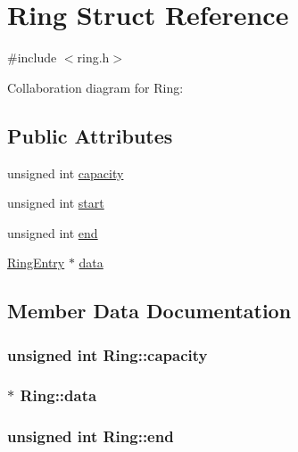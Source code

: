 \hypertarget{structRing}{}\section{Ring Struct Reference}
\label{structRing}


{\ttfamily \#include $<$ring.\+h$>$}



Collaboration diagram for Ring\+:
\subsection*{Public Attributes}
\begin{DoxyCompactItemize}
\item 
unsigned int \hyperlink{structRing_a49514c27dd8d8c6f850ac6cf86c3f8fc}{capacity}
\item 
unsigned int \hyperlink{structRing_a05ded3e84726b36d0b2266e733ddc61e}{start}
\item 
unsigned int \hyperlink{structRing_a704c118e618f3fac90554954b90ff363}{end}
\item 
\hyperlink{structRingEntry}{Ring\+Entry} $\ast$ \hyperlink{structRing_a610017b8cf1bff81f61e32bbf3cdf972}{data}
\end{DoxyCompactItemize}


\subsection{Member Data Documentation}
\subsubsection[{\texorpdfstring{capacity}{capacity}}]{\setlength{\rightskip}{0pt plus 5cm}unsigned int Ring\+::capacity}\hypertarget{structRing_a49514c27dd8d8c6f850ac6cf86c3f8fc}{}\label{structRing_a49514c27dd8d8c6f850ac6cf86c3f8fc}
\subsubsection[{\texorpdfstring{data}{data}}]{$\ast$ Ring\+::data}\hypertarget{structRing_a610017b8cf1bff81f61e32bbf3cdf972}{}\label{structRing_a610017b8cf1bff81f61e32bbf3cdf972}
\subsubsection[{\texorpdfstring{end}{end}}]{\setlength{\rightskip}{0pt plus 5cm}unsigned int Ring\+::end}\hypertarget{structRing_a704c118e618f3fac90554954b90ff363}{}\label{structRing_a704c118e618f3fac90554954b90ff363}
